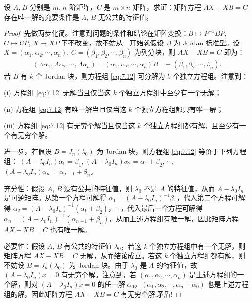 \documentclass[../../main.tex]{subfiles}%
\begin{document}
\begin{proposition}\label{proposition:AX-XB线性映射相关等价条件--(3)}
设 $A$, $B$ 分别是 $m$, $n$ 阶矩阵，$C$ 是 $m\times n$ 矩阵，求证：矩阵方程 $AX - XB = C$ 存在唯一解的充要条件是 $A$, $B$ 无公共的特征值。
\end{proposition}
\begin{proof}
先做两步化简。注意到问题的条件和结论在矩阵变换：$B\mapsto P^{-1}BP$, $C\mapsto CP$, $X\mapsto XP$ 下不改变，故不妨从一开始就假设 $B$ 为 Jordan 标准型。设 $X = (\alpha_1,\alpha_2,\cdots,\alpha_n)$, $C = (\beta_1,\beta_2,\cdots,\beta_n)$ 为列分块，则 $AX - XB = C$ 即为：
\begin{align}
(A\alpha_1,A\alpha_2,\cdots,A\alpha_n) - (\alpha_1,\alpha_2,\cdots,\alpha_n)B &= (\beta_1,\beta_2,\cdots,\beta_n).\label{eq:7.12}
\end{align}
若 $B$ 有 $k$ 个 Jordan 块，则方程组 \eqref{eq:7.12} 可分解为 $k$ 个独立方程组。注意到：

(i) 方程组 \eqref{eq:7.12} 无解当且仅当这 $k$ 个独立方程组中至少有一个无解；

(ii) 方程组 \eqref{eq:7.12} 有唯一解当且仅当这 $k$ 个独立方程组都只有唯一解；

(iii) 方程组 \eqref{eq:7.12} 有无穷个解当且仅当这 $k$ 个独立方程组都有解，且至少有一个有无穷个解。

进一步，若假设 $B = J_n(\lambda_0)$ 为 Jordan 块，则方程组 \eqref{eq:7.12} 等价于下列方程组：
$(A - \lambda_0I_n)\alpha_1 = \beta_1$, $(A - \lambda_0I_n)\alpha_2 = \alpha_1 + \beta_2$, $\cdots$, $(A - \lambda_0I_n)\alpha_n = \alpha_{n - 1} + \beta_n$。

{\heiti 充分性：}假设 $A$, $B$ 没有公共的特征值，则 $\lambda_0$ 不是 $A$ 的特征值，从而 $A - \lambda_0I_n$ 是可逆矩阵。从第一个方程可解得 $\alpha_1 = (A - \lambda_0I_n)^{-1}\beta_1$，代入第二个方程可解得 $\alpha_2 = (A - \lambda_0I_n)^{-1}(\alpha_1 + \beta_2)$，$\cdots$，代入最后一个方程可解得 $\alpha_n = (A - \lambda_0I_n)^{-1}(\alpha_{n - 1} + \beta_n)$，从而上述方程组有唯一解，因此矩阵方程 $AX - XB = C$ 也有唯一解。

{\heiti 必要性：}假设 $A$, $B$ 有公共的特征值 $\lambda_0$，若这 $k$ 个独立方程组中有一个无解，则矩阵方程 $AX - XB = C$ 无解，从而结论成立。若这 $k$ 个独立方程组都有解，则不妨设 $B = J_n(\lambda_0)$ 为 Jordan 块。由于 $\lambda_0$ 是 $A$ 的特征值，故 $(A - \lambda_0I_n)x = 0$ 有无穷个解。注意到，若 $(\alpha_1,\alpha_2,\cdots,\alpha_n)$ 是上述方程组的一个解，则对 $(A - \lambda_0I_n)x = 0$ 的任一解 $\alpha_0$，$(\alpha_1,\alpha_2,\cdots,\alpha_n + \alpha_0)$ 也是上述方程组的解，因此矩阵方程 $AX - XB = C$ 有无穷个解,矛盾!
\end{proof}
\end{document}
